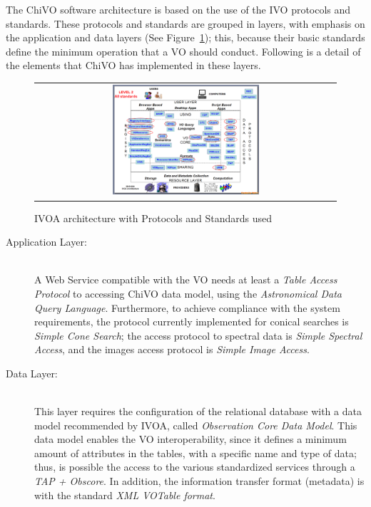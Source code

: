 \documentclass[]{spie}
\begin{document}
The ChiVO software architecture is based on the use of the IVO protocols and
standards.  These protocols and standards are grouped in layers, with emphasis
on the application and data layers (See Figure~\ref{fig:ivoarch}); this,
because their basic standards define the minimum operation that a VO should
conduct.  Following is a detail of the elements that ChiVO has implemented in
these layers.

\begin{figure}
   \begin{center}
   \begin{tabular}{c}
   \includegraphics[width=0.5\textwidth]{images/arquitectura_2.png}
   \end{tabular}
   \end{center}
   \caption[example]
   {\label{fig:ivoarch} IVOA architecture with Protocols and Standards used}
\end{figure}

\begin{description}
    \item[Application Layer:] \hfill \\
        A Web Service compatible with the VO needs at least a \emph{Table
        Access Protocol} to accessing ChiVO data model, using the
        \emph{Astronomical Data Query Language}.  Furthermore, to achieve
        compliance with the system requirements, the protocol currently
        implemented for conical searches is \emph{Simple Cone Search}; the
        access protocol to spectral data is \emph{Simple Spectral Access}, and
        the images access protocol is \emph{Simple Image Access}. 
    \item[Data Layer:] \hfill \\
        This layer requires the configuration of the relational database with a
        data model recommended by IVOA, called \emph{Observation Core Data
        Model}.  This data model enables the VO interoperability, since it
        defines a minimum amount of attributes in the tables, with a specific
        name and type of data; thus, is possible the access to the various
        standardized services through a \emph{TAP + Obscore}.  In addition, the
        information transfer format (metadata) is with the standard \emph{XML
        VOTable format}.
\end{description}
\end{document}
